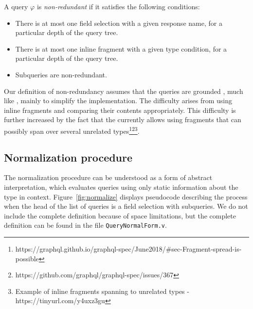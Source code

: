 \begin{definition}
A \gql query $\varphi$ is \textit{non-redundant} if it satisfies the following conditions:
\begin{itemize}
    \item There is at most one field selection with a given response name, for a particular depth of the query tree.

    \item There is at most one inline fragment with a given type condition, for a particular depth of the query tree.
    
    \item Subqueries are non-redundant.
\end{itemize}
\end{definition}

Our definition of non-redundancy assumes that the queries are grounded , much like \HP, mainly to simplify the implementation. The difficulty arises from using inline fragments and comparing their contents appropriately. This difficulty is further increased by the fact that the \spec currently allows using fragments that can possibly span over several unrelated types\footnote{https://graphql.github.io/graphql-spec/June2018/\#sec-Fragment-spread-is-possible}\footnote{https://github.com/graphql/graphql-spec/issues/367}\footnote{Example of inline fragments spanning to unrelated types - https://tinyurl.com/y4uxz3gu}.

\subsection{Normalization procedure}\label{subsec:normalization}

The normalization procedure can be understood as a form of abstract interpretation, which evaluates queries using only static information about the type in context. Figure~\ref{fig:normalize} displays pseudocode describing the process when the head of the list of queries is a field selection with subqueries. We do not include the complete definition because of space limitations, but the complete definition can be found in the file \texttt{QueryNormalForm.v}.


